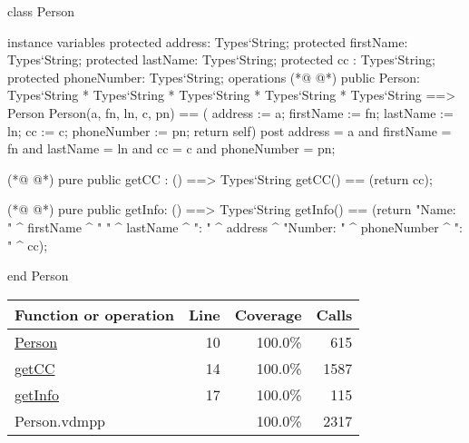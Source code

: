 \begin{vdmpp}[breaklines=true]
class Person

instance variables
  protected address: Types`String;
  protected firstName: Types`String;
  protected lastName: Types`String;
  protected cc : Types`String;
  protected phoneNumber: Types`String;
operations
(*@
\label{Person:10}
@*)
 public Person: Types`String * Types`String * Types`String * Types`String * Types`String ==> Person
  Person(a, fn, ln, c, pn) == ( address := a; firstName := fn; lastName := ln; cc := c; phoneNumber := pn; return self)
 post address = a and firstName = fn and lastName = ln and cc = c and phoneNumber = pn;
  
(*@
\label{getCC:14}
@*)
 pure public getCC : () ==> Types`String
  getCC() == (return cc);
  
(*@
\label{getInfo:17}
@*)
 pure public getInfo: () ==> Types`String
  getInfo() == (return "Name: " ^ firstName ^ " " ^ lastName ^ "\nAddress: " ^ address ^ "\nPhone Number: " ^ phoneNumber ^ "\nCC: " ^ cc);

end Person
\end{vdmpp}
\bigskip
\begin{longtable}{|l|r|r|r|}
\hline
Function or operation & Line & Coverage & Calls \\
\hline
\hline
\hyperref[Person:10]{Person} & 10&100.0\% & 615 \\
\hline
\hyperref[getCC:14]{getCC} & 14&100.0\% & 1587 \\
\hline
\hyperref[getInfo:17]{getInfo} & 17&100.0\% & 115 \\
\hline
\hline
Person.vdmpp & & 100.0\% & 2317 \\
\hline
\end{longtable}

